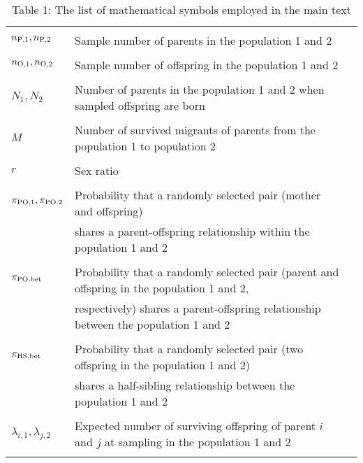 \documentclass[12pt, English]{article}
\begin{document}
\begin{spacing}{1.9}
\renewcommand{\arraystretch}{0.6}
\begin{table}[tb]
\begin{center}
   \caption[]{Table 1: The list of mathematical symbols employed in the main text}
    \textbf {}\\[-4mm]
    \begin{tabular}{llc} \hline
       & & \\
	$n_{\rm P,1}, n_{\rm P, 2}$			& Sample number of parents in the population 1 and 2\\ 
		                						& \\
	$n_{\rm O, 1}, n_{\rm O, 2}$			& Sample number of offspring in the population 1 and 2\\ 
		                						& \\
	$N_{1}, N_{2}$						& Number of parents in the population 1 and 2 when sampled offspring are born\\
		                						& \\
	$M$								& Number of survived migrants of parents from the population 1 to population 2\\
		                						& \\
	$r$								& Sex ratio\\
		                						& \\
	$\pi_{\rm PO,1}, \pi_{\rm PO,2}$		& Probability that a randomly selected pair (mother and offspring) \\
	                							& shares a parent-offspring relationship within the population 1 and 2\\
									& \\
	$\pi_{\rm PO, bet}$					& Probability that a randomly selected pair (parent and offspring in the population 1 and 2, \\
	                							& respectively) shares a parent-offspring relationship between the population 1 and 2\\
									& \\
	$\pi_{\rm HS, bet}$					& Probability that a randomly selected pair (two offspring in the population 1 and 2) \\
	                							& shares a half-sibling relationship between the population 1 and 2\\
					                			& \\
	$\lambda_{i,1}, \lambda_{j,2}$			& Expected number of surviving offspring of parent $i$ and $j$ at sampling in the population 1 and 2\\
		                						& \\

\end{tabular}
\end{center}
\end{table}
\end{spacing}
\end{document}
